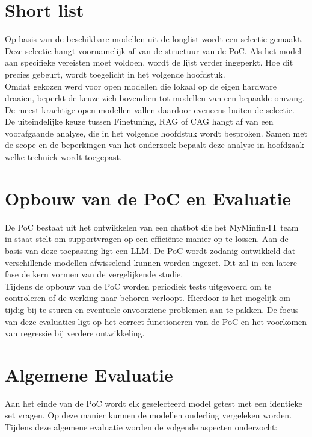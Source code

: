 \section{Short list}

Op basis van de beschikbare modellen uit de longlist wordt een selectie gemaakt. Deze selectie hangt voornamelijk af van de structuur van de PoC. Als het model aan specifieke vereisten moet voldoen, wordt de lijst verder ingeperkt. Hoe dit precies gebeurt, wordt toegelicht in het volgende hoofdstuk.
\\[1em]
Omdat gekozen werd voor open modellen die lokaal op de eigen hardware draaien, beperkt de keuze zich bovendien tot modellen van een bepaalde omvang. De meest krachtige open modellen vallen daardoor eveneens buiten de selectie.
\\[1em]
De uiteindelijke keuze tussen Finetuning, RAG of CAG hangt af van een voorafgaande analyse, die in het volgende hoofdstuk wordt besproken. Samen met de scope en de beperkingen van het onderzoek bepaalt deze analyse in hoofdzaak welke techniek wordt toegepast.

\section{Opbouw van de PoC en Evaluatie}

De PoC bestaat uit het ontwikkelen van een chatbot die het MyMinfin-IT team in staat stelt om supportvragen op een efficiënte manier op te lossen. Aan de basis van deze toepassing ligt een LLM. De PoC wordt zodanig ontwikkeld dat verschillende modellen afwisselend kunnen worden ingezet. Dit zal in een latere fase de kern vormen van de vergelijkende studie.
\\[1em]
Tijdens de opbouw van de PoC worden periodiek tests uitgevoerd om te controleren of de werking naar behoren verloopt. Hierdoor is het mogelijk om tijdig bij te sturen en eventuele onvoorziene problemen aan te pakken. De focus van deze evaluaties ligt op het correct functioneren van de PoC en het voorkomen van regressie bij verdere ontwikkeling.

\section{Algemene Evaluatie}

Aan het einde van de PoC wordt elk geselecteerd model getest met een identieke set vragen. Op deze manier kunnen de modellen onderling vergeleken worden. Tijdens deze algemene evaluatie worden de volgende aspecten onderzocht:


